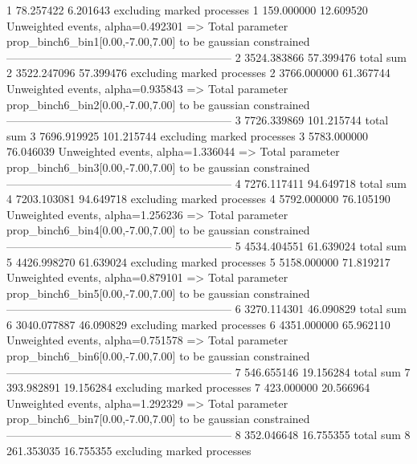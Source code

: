 1          78.257422       6.201643        excluding marked processes    
1          159.000000      12.609520       Unweighted events, alpha=0.492301
  => Total parameter prop_binch6_bin1[0.00,-7.00,7.00] to be gaussian constrained
------------------------------------------------------------
2          3524.383866     57.399476       total sum                     
2          3522.247096     57.399476       excluding marked processes    
2          3766.000000     61.367744       Unweighted events, alpha=0.935843
  => Total parameter prop_binch6_bin2[0.00,-7.00,7.00] to be gaussian constrained
------------------------------------------------------------
3          7726.339869     101.215744      total sum                     
3          7696.919925     101.215744      excluding marked processes    
3          5783.000000     76.046039       Unweighted events, alpha=1.336044
  => Total parameter prop_binch6_bin3[0.00,-7.00,7.00] to be gaussian constrained
------------------------------------------------------------
4          7276.117411     94.649718       total sum                     
4          7203.103081     94.649718       excluding marked processes    
4          5792.000000     76.105190       Unweighted events, alpha=1.256236
  => Total parameter prop_binch6_bin4[0.00,-7.00,7.00] to be gaussian constrained
------------------------------------------------------------
5          4534.404551     61.639024       total sum                     
5          4426.998270     61.639024       excluding marked processes    
5          5158.000000     71.819217       Unweighted events, alpha=0.879101
  => Total parameter prop_binch6_bin5[0.00,-7.00,7.00] to be gaussian constrained
------------------------------------------------------------
6          3270.114301     46.090829       total sum                     
6          3040.077887     46.090829       excluding marked processes    
6          4351.000000     65.962110       Unweighted events, alpha=0.751578
  => Total parameter prop_binch6_bin6[0.00,-7.00,7.00] to be gaussian constrained
------------------------------------------------------------
7          546.655146      19.156284       total sum                     
7          393.982891      19.156284       excluding marked processes    
7          423.000000      20.566964       Unweighted events, alpha=1.292329
  => Total parameter prop_binch6_bin7[0.00,-7.00,7.00] to be gaussian constrained
------------------------------------------------------------
8          352.046648      16.755355       total sum                     
8          261.353035      16.755355       excluding marked processes    
